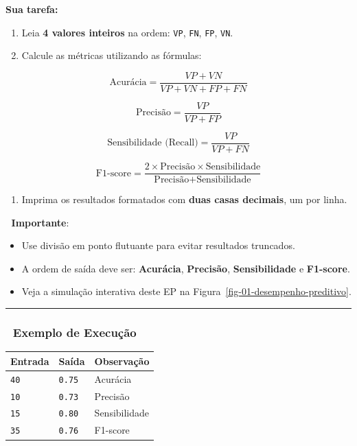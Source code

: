 \documentclass[
  portuguese,
  letterpaper,
  openany,
  oneside,
  12pt,
  a4paper]{book}
\providecommand{\tightlist}{%
  \setlength{\itemsep}{0pt}\setlength{\parskip}{0pt}}
\begin{document}
\textbf{Sua tarefa:}

\begin{enumerate}
\def\labelenumi{\arabic{enumi}.}
\tightlist
\item
  Leia \textbf{4 valores inteiros} na ordem: \texttt{VP}, \texttt{FN},
  \texttt{FP}, \texttt{VN}.
\item
  Calcule as métricas utilizando as fórmulas:
\end{enumerate}

\[\text{Acurácia} = \frac{VP + VN}{VP + VN + FP + FN}\]

\[\text{Precisão} = \frac{VP}{VP + FP}\]

\[\text{Sensibilidade (Recall)} = \frac{VP}{VP + FN}\]

\[\text{F1-score} = \frac{2 \times \text{Precisão} \times \text{Sensibilidade}}{\text{Precisão} + \text{Sensibilidade}}\]

\begin{enumerate}
\def\labelenumi{\arabic{enumi}.}
\setcounter{enumi}{2}
\tightlist
\item
  Imprima os resultados formatados com \textbf{duas casas decimais}, um
  por linha.
\end{enumerate}

📌 \textbf{Importante}:

\begin{itemize}
\tightlist
\item
  Use divisão em ponto flutuante para evitar resultados truncados.
\item
  A ordem de saída deve ser: \textbf{Acurácia}, \textbf{Precisão},
  \textbf{Sensibilidade} e \textbf{F1-score}.
\item
  Veja a simulação interativa deste EP na
  Figura~\ref{fig-01-desempenho-preditivo}.
\end{itemize}

\begin{center}\rule{0.5\linewidth}{0.5pt}\end{center}

\subsubsection{📌 Exemplo de Execução}\label{exemplo-de-execuuxe7uxe3o}

\begin{longtable}[]{@{}lll@{}}
\toprule\noalign{}
Entrada & Saída & Observação \\
\midrule\noalign{}
\endhead
\bottomrule\noalign{}
\endlastfoot
\texttt{40} & \texttt{0.75} & Acurácia \\
\texttt{10} & \texttt{0.73} & Precisão \\
\texttt{15} & \texttt{0.80} & Sensibilidade \\
\texttt{35} & \texttt{0.76} & F1-score \\
\end{longtable}
\end{document}
